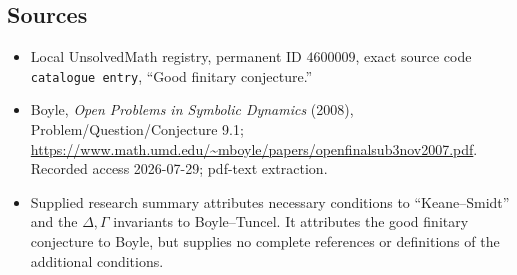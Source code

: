 \documentclass[11pt]{article}
\begin{document}
\subsection{Sources}
\begin{itemize}
\item Local UnsolvedMath registry, permanent ID \(4600009\), exact source code \texttt{catalogue entry}, ``Good finitary conjecture.''
\item Boyle, \emph{Open Problems in Symbolic Dynamics} (2008), Problem/Question/Conjecture 9.1; \url{https://www.math.umd.edu/~mboyle/papers/openfinalsub3nov2007.pdf}. Recorded access 2026-07-29; pdf-text extraction.
\item Supplied research summary attributes necessary conditions to ``Keane--Smidt'' and the \(\Delta,\Gamma\) invariants to Boyle--Tuncel. It attributes the good finitary conjecture to Boyle, but supplies no complete references or definitions of the additional conditions.
\end{itemize}
\end{document}
